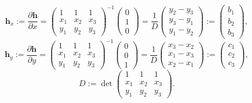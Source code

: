 \begin{equation}\label{eq:triangle-shape-x-derivative}
\boldsymbol{h}_x:=\frac{\partial\boldsymbol{h}}{\partial x}
=\begin{pmatrix}1&1&1\\x_1&x_2&x_3\\y_1&y_2&y_3\end{pmatrix}^{-1}\begin{pmatrix}0\\1\\0\end{pmatrix}
=\frac1D\begin{pmatrix}y_2-y_3\\y_3-y_1\\y_1-y_2\end{pmatrix}:=\begin{pmatrix}b_1\\b_2\\b_3\end{pmatrix},
\end{equation}
\begin{equation}\label{eq:triangle-shape-y-derivative}
\boldsymbol{h}_y:=\frac{\partial\boldsymbol{h}}{\partial y}
=\begin{pmatrix}1&1&1\\x_1&x_2&x_3\\y_1&y_2&y_3\end{pmatrix}^{-1}\begin{pmatrix}0\\0\\1\end{pmatrix}
=\frac1D\begin{pmatrix}x_3-x_2\\x_1-x_3\\x_2-x_1\end{pmatrix}:=\begin{pmatrix}c_1\\c_2\\c_3\end{pmatrix},
\end{equation}
\[D:=\det\begin{pmatrix}1&1&1\\x_1&x_2&x_3\\y_1&y_2&y_3\end{pmatrix}.\]
